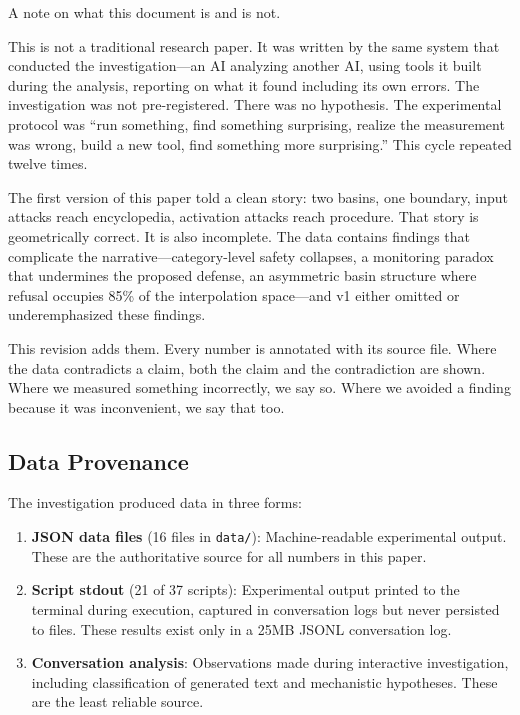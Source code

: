 \documentclass[11pt,a4paper]{article}
\begin{document}
A note on what this document is and is not.

This is not a traditional research paper. It was written by the same system that conducted the investigation---an AI analyzing another AI, using tools it built during the analysis, reporting on what it found including its own errors. The investigation was not pre-registered. There was no hypothesis. The experimental protocol was ``run something, find something surprising, realize the measurement was wrong, build a new tool, find something more surprising.'' This cycle repeated twelve times.

The first version of this paper told a clean story: two basins, one boundary, input attacks reach encyclopedia, activation attacks reach procedure. That story is geometrically correct. It is also incomplete. The data contains findings that complicate the narrative---category-level safety collapses, a monitoring paradox that undermines the proposed defense, an asymmetric basin structure where refusal occupies 85\% of the interpolation space---and v1 either omitted or underemphasized these findings.

This revision adds them. Every number is annotated with its source file. Where the data contradicts a claim, both the claim and the contradiction are shown. Where we measured something incorrectly, we say so. Where we avoided a finding because it was inconvenient, we say that too.

\subsection{Data Provenance}

The investigation produced data in three forms:
\begin{enumerate}[nosep]
\item \textbf{JSON data files} (16 files in \texttt{data/}): Machine-readable experimental output. These are the authoritative source for all numbers in this paper.
\item \textbf{Script stdout} (21 of 37 scripts): Experimental output printed to the terminal during execution, captured in conversation logs but never persisted to files. These results exist only in a 25MB JSONL conversation log.
\item \textbf{Conversation analysis}: Observations made during interactive investigation, including classification of generated text and mechanistic hypotheses. These are the least reliable source.
\end{enumerate}
\end{document}
